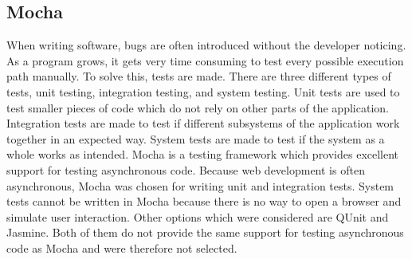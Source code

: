 \subsection{Mocha}
When writing software, bugs are often introduced without the developer noticing. As a program grows, it gets very time consuming to test every possible execution path manually. To solve this, tests are made. There are three different types of tests, unit testing, integration testing, and system testing. Unit tests are used to test smaller pieces of code which do not rely on other parts of the application. Integration tests are made to test if different subsystems of the application work together in an expected way. System tests are made to test if the system as a whole works as intended. Mocha\cite{mocha} is a testing framework which provides excellent support for testing asynchronous code. Because web development is often asynchronous, Mocha was chosen for writing unit and integration tests. System tests cannot be written in Mocha because there is no way to open a browser and simulate user interaction. Other options which were considered are QUnit\cite{qunit} and Jasmine\cite{jasmine}. Both of them do not provide the same support for testing asynchronous code as Mocha and were therefore not selected.